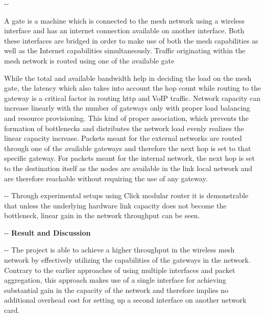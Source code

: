 \documentclass[12pt]{article}
\makeatletter
\newenvironment{indentation}[3]%
	{\par\setlength{\parindent}{#3}
	\setlength{\leftmargin}{#1}       \setlength{\rightmargin}{#1}%
	\advance\linewidth -\leftmargin       \advance\linewidth -\rightmargin%
	\advance\@totalleftmargin\leftmargin  \@setpar{{\@@par}}%
	\parshape 1\@totalleftmargin \linewidth\ignorespaces}{\par}%
\makeatother
\begin{document}
\begin{indentation}{0pt}{0pt}{0pt}
{\normalsize \hspace{1cm} A gate is a machine which is connected to the mesh network using a wireless interface and has an internet connection available on another interface. Both these interfaces are bridged in order to make use of both the mesh capabilities as well as the Internet capabilities simultaneously. Traffic originating within the mesh network is routed using one of the available gate

While the total and available bandwidth help in deciding the load on the mesh gate, the latency which also takes into account the hop count while routing to the gateway is a critical factor in routing http and VoIP traffic. Network capacity can increase linearly with the number of gateways only with proper load balancing and resource provisioning. This kind of proper association, which prevents the formation of bottlenecks and distributes the network load evenly realizes the linear capacity increase. Packets meant for the external networks are routed through one of the available gateways and therefore the next hop is set to that specific gateway. For packets meant for the internal network, the next hop is set to the destination itself as the nodes are available in the link local network and are therefore reachable without requiring the use of any gateway.}
\end{indentation}


\begin{indentation}{0pt}{0pt}{0pt}
{\normalsize \hspace{1cm} Through experimental setups using Click modular router it is demonstrable that unless the underlying hardware link capacity does not become the bottleneck, linear gain in the network throughput can be seen.}
\end{indentation}

\pagebreak
\begin{indentation}{0pt}{0pt}{0pt}
\vspace{1cm}
\textbf{{{\Large Result and Discussion}}}
\end{indentation}
\vspace{0.5cm}

\begin{indentation}{0pt}{0pt}{0pt}
{\normalsize \hspace{1cm} The project is able to achieve a higher throughput in the wireless mesh network by effectively utilizing the capabilities of the gateways in the network. Contrary to the earlier approaches of using multiple interfaces and packet aggregation, this approach makes use of a single interface for achieving substantial gain in the capacity of the network and therefore implies no additional overhead cost for setting up a second interface on another network card.}
\end{indentation}
\end{document}
